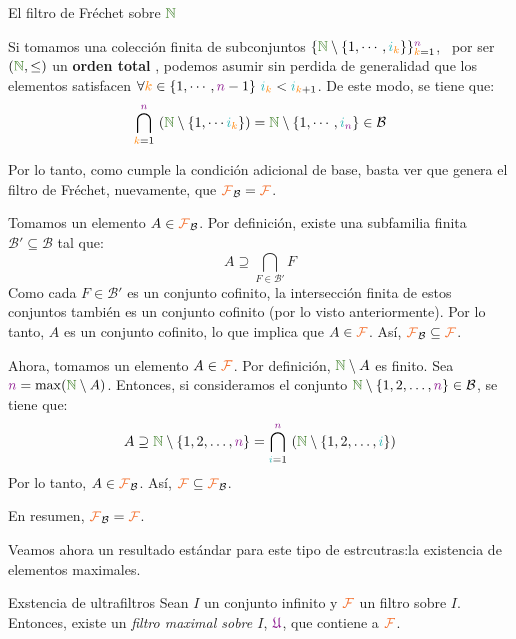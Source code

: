 \documentclass[titlepage,11pt,a4paper]{book}
\newcommand{\NN}{\ensuremath{\textcolor{OliveGreen}{\mathbb{N}}}}
\newcommand{\filt}{\ensuremath{\textcolor{Orange}{\mathcal{F}}}}
\newcommand{\ultf}{\ensuremath{\textcolor{Plum}{\mathfrak{U}}}}
\newcommand{\ii}{\ensuremath{\textcolor{TealBlue}{i}}}
\newcommand{\nn}{\ensuremath{\textcolor{Plum}{n}}}
\newcommand{\kk}{\textcolor{orange}{k}}
\newcommand{\borde}[1]{%
  \begingroup
  \setlength{\fboxsep}{2.5pt}%
  \setlength{\fboxrule}{1pt}%
  \textcolor{black}{\fbox{\normalcolor\ensuremath{#1}}}%
  \hspace{4pt}%
  \vspace{0.5 pt}
  \endgroup
}
\begin{document}
\begin{ejemplo*}{El filtro de Fréchet sobre \NN}
\begin{itemize}
        \medskip
        Si tomamos una colección finita de subconjuntos $\{\NN \setminus \{1, \cdots, \ii_{\kk}\}\}_{\kk=1}^{\nn}$, \ por ser $(\NN,\leq)$ un \textbf{orden total}
        , podemos asumir sin perdida de generalidad que los elementos satisfacen $\forall \kk \in \{1, \cdots, \nn -1 \} \ \ii_{\kk} < \ii_{\kk+1}$. De este modo, se tiene que:
        \[
        \bigcap_{\kk = 1}^{\nn} \ (\NN \setminus \{1, \cdots \ii_{\kk}\}) = \NN \setminus \{1, \cdots, \ii_{\nn}\} \in \mathcal B
        \]

        Por lo tanto, como cumple la condición adicional de base, basta ver que genera el filtro de Fréchet, nuevamente, que $\filt_{\mathcal B} = \filt$.

        \medskip
        \borde{\subseteq} Tomamos un elemento $A \in \filt_{\mathcal B}$. Por definición, existe una subfamilia finita $\mathcal B' \subseteq \mathcal B$ tal que:
        \[
            A \supseteq \bigcap_{F \in \mathcal B'} F
        \]
        Como cada $F \in \mathcal B'$ es un conjunto cofinito, la intersección finita de estos conjuntos también es un conjunto cofinito (por lo visto anteriormente). Por lo tanto, $A$ es un conjunto cofinito, lo que implica que $A \in \filt$. Así, $\filt_{\mathcal B} \subseteq \filt$.

        \smallskip
        \borde{\supseteq} Ahora, tomamos un elemento $A \in \filt$. Por definición, $\NN \setminus A$ es finito. Sea $\nn = \max(\NN \setminus A)$. Entonces, si consideramos el conjunto $\NN \setminus \{1, 2, \ldots, \nn\} \in \mathcal B$, se tiene que:
        \[
            A \supseteq \NN \setminus \{1, 2, \ldots, \nn\} = \bigcap_{\ii = 1}^{\nn} \ (\NN \setminus \{1, 2, \ldots, \ii\}) 
        \]
        Por lo tanto, $A \in \filt_{\mathcal B}$. Así, $\filt \subseteq \filt_{\mathcal B}$.
        

        En resumen, $\filt_{\mathcal B} = \filt$.

        \medskip
    \end{itemize}
\end{ejemplo*}
    
\medskip
Veamos ahora un resultado estándar para este tipo de estrcutras:la existencia de elementos maximales.

\begin{prop*}{Exstencia de ultrafiltros}
    Sean $I$ un conjunto infinito y $\filt$ un filtro sobre $I$. Entonces, existe un \textit{filtro maximal sobre $I$}, $\ultf$, que contiene a $\filt$.
\end{prop*}
\end{document}
